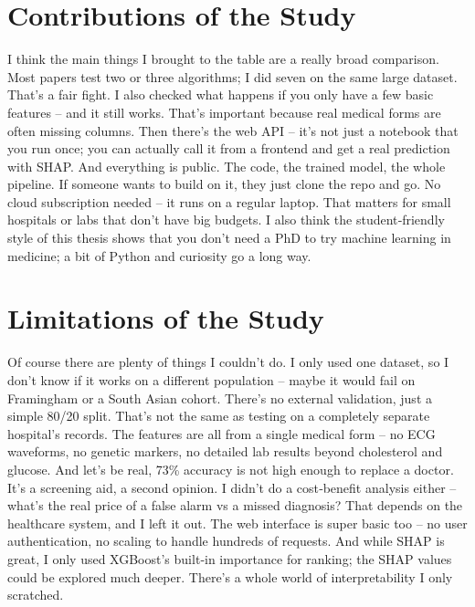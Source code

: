 \documentclass[11pt, a4paper, oneside]{book}
\begin{document}
\section{Contributions of the Study}
I think the main things I brought to the table are a really broad comparison. Most papers test two or three algorithms; I did seven on the same large dataset. That’s a fair fight. I also checked what happens if you only have a few basic features – and it still works. That’s important because real medical forms are often missing columns. Then there’s the web API – it’s not just a notebook that you run once; you can actually call it from a frontend and get a real prediction with SHAP. And everything is public. The code, the trained model, the whole pipeline. If someone wants to build on it, they just clone the repo and go. No cloud subscription needed – it runs on a regular laptop. That matters for small hospitals or labs that don’t have big budgets. I also think the student‑friendly style of this thesis shows that you don’t need a PhD to try machine learning in medicine; a bit of Python and curiosity go a long way.

\section{Limitations of the Study}
Of course there are plenty of things I couldn’t do. I only used one dataset, so I don’t know if it works on a different population – maybe it would fail on Framingham or a South Asian cohort. There’s no external validation, just a simple 80/20 split. That’s not the same as testing on a completely separate hospital’s records. The features are all from a single medical form – no ECG waveforms, no genetic markers, no detailed lab results beyond cholesterol and glucose. And let’s be real, 73\% accuracy is not high enough to replace a doctor. It’s a screening aid, a second opinion. I didn’t do a cost‑benefit analysis either – what’s the real price of a false alarm vs a missed diagnosis? That depends on the healthcare system, and I left it out. The web interface is super basic too – no user authentication, no scaling to handle hundreds of requests. And while SHAP is great, I only used XGBoost’s built‑in importance for ranking; the SHAP values could be explored much deeper. There’s a whole world of interpretability I only scratched.
\end{document}
